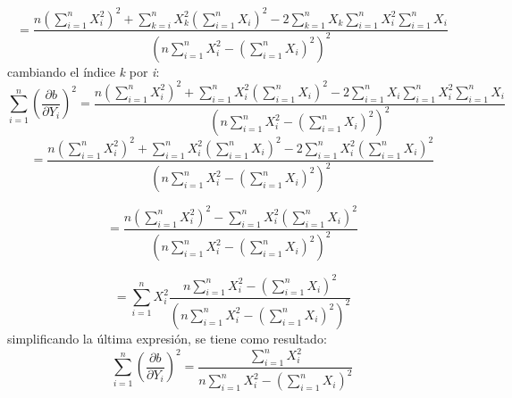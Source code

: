 \documentclass[12pt,letterpaper]{report}
\begin{document}
\begin{equation}
 = \dfrac{  n \left(   \displaystyle\sum_{i=1}^{n} X_{i}^{2}   \right) ^{2}  +
\displaystyle\sum_{k=i}^{n} X_{k}^{2}  \left( \displaystyle\sum_{i=1}^{n} X_{i} \right) ^{2} -
2 \displaystyle\sum_{k=1}^{n} X_{k} \displaystyle\sum_{i=1}^{n} X_{i}^{2}  \displaystyle\sum_{i=1}^{n} X_{i}  }{\left( n \displaystyle\sum_{i=1}^{n} X_{i}^{2}- \left( \displaystyle\sum_{i=1}^{n} X_{i} \right) ^{2}     \right) ^{2}}
\end{equation}
cambiando el índice \textit{k} por \textit{i}:
\begin{equation}
\displaystyle\sum_{i=1}^{n} \left( \dfrac{\partial b}{\partial Y_{i}} \right) ^{2}
= \dfrac{  n \left(   \displaystyle\sum_{i=1}^{n} X_{i}^{2}   \right) ^{2}  +
\displaystyle\sum_{i=1}^{n} X_{i}^{2}  \left( \displaystyle\sum_{i=1}^{n} X_{i} \right) ^{2} -
2 \displaystyle\sum_{i=1}^{n} X_{i} \displaystyle\sum_{i=1}^{n} X_{i}^{2}  \displaystyle\sum_{i=1}^{n} X_{i}  }{\left( n \displaystyle\sum_{i=1}^{n} X_{i}^{2}- \left( \displaystyle\sum_{i=1}^{n} X_{i} \right) ^{2}     \right) ^{2}}
\end{equation}
\begin{equation}
= \dfrac{  n \left(   \displaystyle\sum_{i=1}^{n} X_{i}^{2}   \right) ^{2}  +
\displaystyle\sum_{i=1}^{n} X_{i}^{2}  \left( \displaystyle\sum_{i=1}^{n} X_{i} \right) ^{2} -
2 \displaystyle\sum_{i=1}^{n} X_{i}^{2} \left(  \displaystyle\sum_{i=1}^{n} X_{i} \right) ^{2} }{\left( n \displaystyle\sum_{i=1}^{n} X_{i}^{2}- \left( \displaystyle\sum_{i=1}^{n} X_{i} \right) ^{2}     \right) ^{2}}
\end{equation}

\begin{equation}
= \dfrac{  n \left(   \displaystyle\sum_{i=1}^{n} X_{i}^{2}   \right) ^{2}   -
 \displaystyle\sum_{i=1}^{n} X_{i}^{2} \left(  \displaystyle\sum_{i=1}^{n} X_{i} \right) ^{2} }{\left( n \displaystyle\sum_{i=1}^{n} X_{i}^{2}- \left( \displaystyle\sum_{i=1}^{n} X_{i} \right) ^{2}     \right) ^{2}}
\end{equation}

\begin{equation}
=   \displaystyle\sum_{i=1}^{n} X_{i}^{2}   \dfrac{  n  \displaystyle\sum_{i=1}^{n} X_{i}^{2}     -
  \left(  \displaystyle\sum_{i=1}^{n} X_{i} \right) ^{2} }{\left( n \displaystyle\sum_{i=1}^{n} X_{i}^{2}- \left( \displaystyle\sum_{i=1}^{n} X_{i} \right) ^{2}     \right) ^{2}}
\end{equation}
simplificando la última expresión, se tiene como resultado:
\begin{equation}\label{deltab}
\displaystyle\sum_{i=1}^{n} \left( \dfrac{\partial b}{\partial Y_{i}} \right) ^{2} =
\dfrac{\displaystyle\sum_{i=1}^{n} X_{i}^{2}}{n \displaystyle\sum_{i=1}^{n} X_{i}^{2}- \left( \displaystyle\sum_{i=1}^{n} X_{i} \right) ^{2}}
\end{equation}
\end{document}
